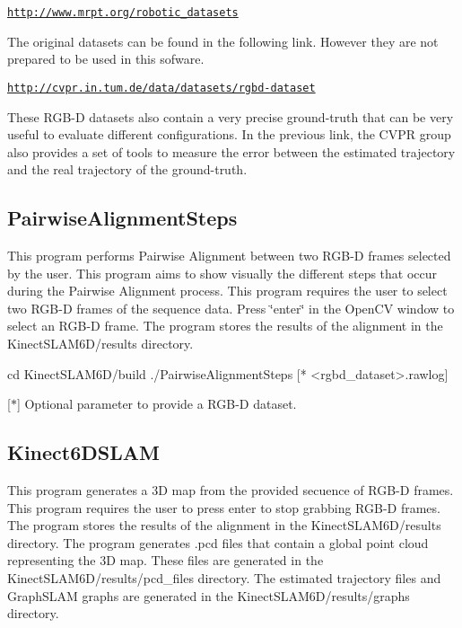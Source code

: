 \href{http://www.mrpt.org/robotic_datasets}{\tt http://www.mrpt.org/robotic\_\-datasets}

The original datasets can be found in the following link. However they are not prepared to be used in this sofware.

\href{http://cvpr.in.tum.de/data/datasets/rgbd-dataset}{\tt http://cvpr.in.tum.de/data/datasets/rgbd-\/dataset}

These RGB-\/D datasets also contain a very precise ground-\/truth that can be very useful to evaluate different configurations. In the previous link, the CVPR group also provides a set of tools to measure the error between the estimated trajectory and the real trajectory of the ground-\/truth.\hypertarget{index_PairwiseAlignmentSteps}{}\subsection{PairwiseAlignmentSteps}\label{index_PairwiseAlignmentSteps}
This program performs Pairwise Alignment between two RGB-\/D frames selected by the user. This program aims to show visually the different steps that occur during the Pairwise Alignment process. This program requires the user to select two RGB-\/D frames of the sequence data. Press \char`\"{}enter\char`\"{} in the OpenCV window to select an RGB-\/D frame. The program stores the results of the alignment in the KinectSLAM6D/results directory.

\begin{DoxyVerb}
cd KinectSLAM6D/build
./PairwiseAlignmentSteps [* <rgbd_dataset>.rawlog]
\end{DoxyVerb}
 \mbox{[}$\ast$\mbox{]} Optional parameter to provide a RGB-\/D dataset.

   \hypertarget{index_Kinect6DSLAM}{}\subsection{Kinect6DSLAM}\label{index_Kinect6DSLAM}
This program generates a 3D map from the provided secuence of RGB-\/D frames. This program requires the user to press enter to stop grabbing RGB-\/D frames. The program stores the results of the alignment in the KinectSLAM6D/results directory. The program generates .pcd files that contain a global point cloud representing the 3D map. These files are generated in the KinectSLAM6D/results/pcd\_\-files directory. The estimated trajectory files and GraphSLAM graphs are generated in the KinectSLAM6D/results/graphs directory.

